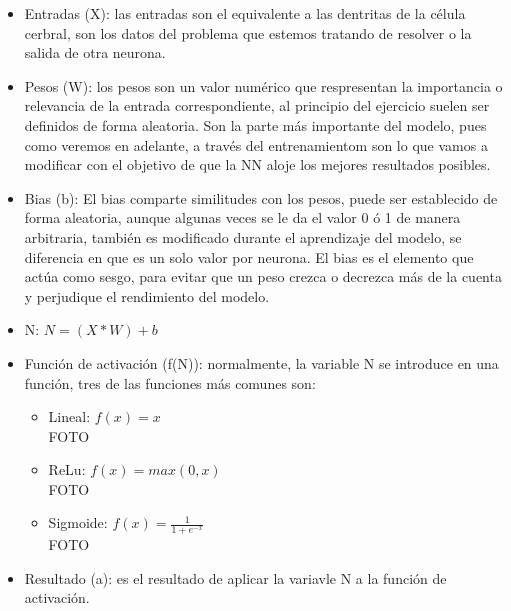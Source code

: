 \documentclass[a4paper,10pt]{article}
\begin{document}
\begin{itemize}
    \item Entradas (X): las entradas son el equivalente a las dentritas de la célula cerbral, son los datos del problema que estemos tratando de resolver o la salida de otra neurona.
    \item Pesos (W): los pesos son un valor numérico que respresentan la importancia o relevancia de la entrada correspondiente, al principio del ejercicio suelen ser definidos de forma aleatoria. Son la parte más importante del modelo, pues como veremos en adelante, a través del entrenamientom son lo que vamos a modificar con el objetivo de que la NN aloje los mejores resultados posibles.
    \item Bias (b): El bias comparte similitudes con los pesos, puede ser establecido de forma aleatoria, aunque algunas veces se le da el valor 0 ó 1 de manera arbitraria,   también es modificado durante el aprendizaje del modelo, se diferencia en que es un solo valor por neurona. El bias es el elemento que actúa como sesgo, para evitar que un peso crezca o decrezca más de la cuenta y perjudique el rendimiento del modelo.
    \item N: $N=(X*W)+b$
    \item Función de activación (f(N)): normalmente, la variable N se introduce en una función, tres de las funciones más comunes son:
    \begin{itemize}
    \item Lineal: $f(x)=x$ \\FOTO
    \item ReLu: $f(x)=max(0,x)$ \\FOTO
    \item Sigmoide: $f(x)= \frac{1}{1+e^{-x}}$ \\FOTO
    \end{itemize}
    \item Resultado (a): es el resultado de aplicar la variavle N a la función de activación.
        
\end{itemize}
\end{document}
